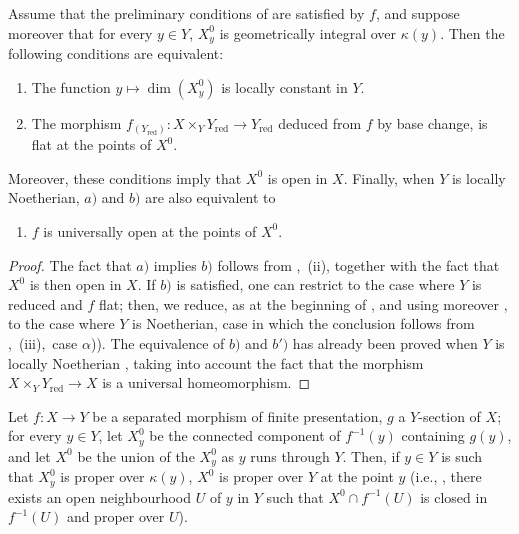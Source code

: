 \begin{corollary}[15.6.7]
\label{IV.15.6.7}
Assume that the preliminary conditions of  are satisfied by $f$, and suppose moreover that for every $y\in Y$, $X_y^0$ is geometrically integral over $\kappa(y)$.
Then the following conditions are equivalent:
\begin{enumerate}[label=\emph{\alph*)}]
  \item The function $y\mapsto\dim(X_y^0)$ is locally constant in $Y$.
  \item The morphism $f_{(Y_\mathrm{red})}:X\times_Y Y_\mathrm{red}\to Y_\mathrm{red}$ deduced from $f$ by base change, is flat at the points of $X^0$.
\end{enumerate}
Moreover, these conditions imply that $X^0$ is open in $X$.
Finally, when $Y$ is locally Noetherian, $a)$ and $b)$ are also equivalent to
\begin{enumerate}
  \item[\rm b$'$)] $f$ is universally open at the points of $X^0$.
\end{enumerate}
\end{corollary}

\begin{proof}
The fact that $a)$ implies $b)$ follows from ,~(ii), together with the fact that $X^0$ is then open in $X$.
If $b)$ is satisfied, one can restrict to the case where $Y$ is reduced and $f$ flat; then, we reduce, as at the beginning of , and using moreover , to the case where $Y$ is Noetherian, case in which the conclusion follows from ,~(iii),~case $\alpha$)).
The equivalence of $b)$ and $b')$ has already been proved when $Y$ is locally Noetherian , taking into account the fact that the morphism $X\times_Y Y_\mathrm{red}\to X$ is a universal homeomorphism.
\end{proof}

\begin{proposition}[15.6.8]
\label{IV.15.6.8}
Let $f:X\to Y$ be a separated morphism of finite presentation, $g$ a $Y$-section of $X$; for every $y\in Y$, let $X_y^0$ be the connected component of $f^{-1}(y)$ containing $g(y)$, and let $X^0$ be the union of the $X_y^0$ as $y$ runs through $Y$.
Then, if $y\in Y$ is such that $X_y^0$ is proper over $\kappa(y)$, $X^0$ is proper over $Y$ at the point $y$ (i.e., , there exists an open neighbourhood $U$ of $y$ in $Y$ such that $X^0\cap f^{-1}(U)$ is closed in $f^{-1}(U)$ and proper over $U$).
\end{proposition}

